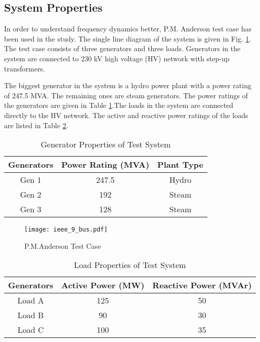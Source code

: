 \subsection{System Properties}
In order to understand frequency dynamics better, P.M. Anderson test case has been used in the study. The single line diagram of the system is given in Fig. \ref{ieee_9_bus}. The test case consists of three generators and three loads. Generators in the system are connected to 230 kV high voltage (HV) network with step-up transformers.\par
The biggest generator in the system is a hydro power plant with a power rating of 247.5 MVA. The remaining ones are steam generators. The power ratings of the generators are given in Table \ref{generatorproperties}.The loads in the system are connected directly to the HV network. The active and reactive power ratings of the loads are listed in Table \ref{loadproperties}.
\begin{table}[h]
	\centering
	\begin{tabular}{ccc}
		\hline
		\textbf{Generators} & \textbf{Power Rating (MVA)} & \textbf{Plant Type} \\ \hline
		Gen 1               & 247.5                       & Hydro				\\
		Gen 2               & 192                         & Steam               \\
		Gen 3               & 128                         & Steam               \\ \hline
	\end{tabular}
	\caption{Generator Properties of Test System}
	\label{generatorproperties}
\end{table}
\begin{figure}[h]
	\centering
	\texttt{[image: ieee\_9\_bus.pdf]}
	\caption{P.M.Anderson Test Case}
	\label{ieee_9_bus}
\end{figure}
\begin{table}[h!]
	\centering
	\begin{tabular}{ccc}
		\hline
		\textbf{Generators} & \textbf{Active Power (MW)}  & \textbf{Reactive Power (MVAr)} \\ \hline
		Load A              & 125                      	  & 50				 \\
		Load B              & 90                          & 30                \\
		Load C              & 100                         & 35                \\ \hline
	\end{tabular}
	\caption{Load Properties of Test System}
	\label{loadproperties}
\end{table}
